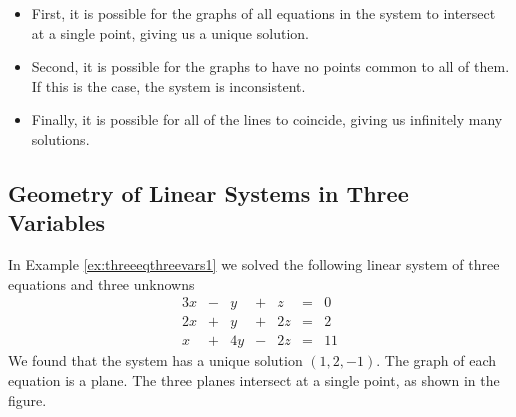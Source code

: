 \documentclass{ximera}
\begin{document}
\begin{itemize}
\item First, it is possible for the graphs of all equations in the system to intersect at a single point, giving us a unique solution.  

\begin{center}
\end{center}

\item Second, it is possible for the graphs to have no points common to all of them.  If this is the case, the system is inconsistent.

\begin{center}
\quad\quad
{}
\end{center}

\item Finally, it is possible for all of the lines to coincide, giving us infinitely many solutions.
\end{itemize}
\subsection*{Geometry of Linear Systems in Three Variables}
In Example \ref{ex:threeeqthreevars1} we solved the following linear system of three equations and three unknowns
$$\begin{array}{ccccccc}
      3x & -&y&+&z&= &0 \\
	 2x& +&y&+&2z&=&2\\
     x& +&4y&-&2z&=&11
    \end{array}$$
We found that the system has a unique solution $(1, 2, -1)$.  The graph of each equation is a plane.  The three planes intersect at a single point, as shown in the figure.
    
\end{document}
